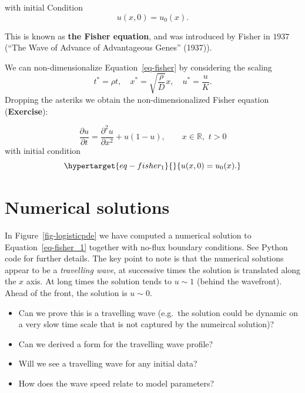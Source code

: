 \documentclass[
  letterpaper,
  DIV=11,
  numbers=noendperiod]{scrreprt}
\providecommand{\tightlist}{%
  \setlength{\itemsep}{0pt}\setlength{\parskip}{0pt}}\usepackage{longtable,booktabs,array}
\theoremstyle{definition}
\theoremstyle{plain}
\theoremstyle{plain}
\theoremstyle{remark}
\begin{document}
with initial Condition \[
u(x,0) =u_0(x). 
\]

This is known as \textbf{the Fisher equation}, and was introduced by
Fisher in \(1937\) ({``The Wave of Advance of Advantageous Genes''}
(1937)).

We can non-dimensionalize Equation~\ref{eq-fisher} by considering the
scaling
\[t^\ast = \rho t, \quad  x^\ast = \sqrt{\dfrac \rho D} x, \quad  u^\ast = \displaystyle{\frac u K}.
\] Dropping the asteriks we obtain the non-dimensionalized Fisher
equation (\textbf{Exercise}):

\[
\frac{\partial u}{\partial t} = \frac{\partial^2 u}{\partial x^2} +   u(1-u), \qquad x\in \mathbb R, \, \, t >0 
\] with initial condition
\begin{equation}\protect\hypertarget{eq-fisher_1}{}{
u(x,0) = u_0(x).
}\label{eq-fisher_1}\end{equation}

\hypertarget{numerical-solutions}{%
\section{Numerical solutions}\label{numerical-solutions}}

In Figure~\ref{fig-logisticpde} we have computed a numerical solution to
Equation~\ref{eq-fisher_1} together with no-flux boundary conditions.
See Python code for further details. The key point to note is that the
numerical solutions appear to be a \emph{travelling wave}, at successive
times the solution is translated along the \(x\) axis. At long times the
solution tends to \(u\sim1\) (behind the wavefront). Ahead of the front,
the solution is \(u\sim0\).

\begin{itemize}
\tightlist
\item
  Can we prove this is a travelling wave (e.g.~the solution could be
  dynamic on a very slow time scale that is not captured by the
  numeircal solution)?
\item
  Can we derived a form for the travelling wave profile?
\item
  Will we see a travelling wave for any initial data?
\item
  How does the wave speed relate to model parameters?
\end{itemize}
\end{document}
